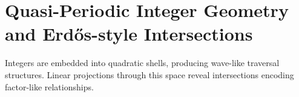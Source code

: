 \section*{Quasi-Periodic Integer Geometry and Erdős-style Intersections}

Integers are embedded into quadratic shells, producing wave-like traversal structures. Linear projections through this space reveal intersections encoding factor-like relationships.
